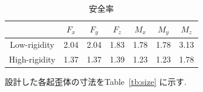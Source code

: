 \begin{table}[h]
  \caption{安全率\label{tb:anzen}}
  \begin{center}
   \begin{tabular}{ c c c c c c c }
    \hline
     & $F_x$ & $F_y$ & $F_z$ & $M_x$ & $M_y$ & $M_z$  \\
    \hline
    Low-rigidity & 2.04 & 2.04 & 1.83 & 1.78 & 1.78 & 3.13  \\
    \hline
    High-rigidity & 1.37 & 1.37 & 1.39 & 1.23 & 1.23 & 1.78  \\
    \hline   
   \end{tabular}
  \end{center}
 \end{table}


設計した各起歪体の寸法をTable~\ref{tb:size} に示す. 

